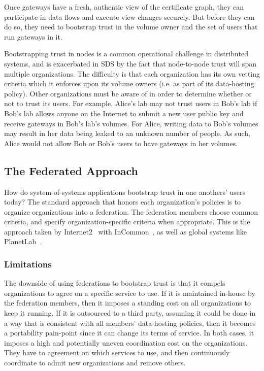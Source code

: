 Once gateways have a fresh, authentic view of the certificate graph, they can
participate in data flows and execute view changes securely.  But before they
can do so, they need to bootstrap trust in the volume owner and the set of users
that run gateways in it.

Bootstrapping trust in nodes is a common operational challenge in
distributed systems, and is exacerbated in SDS by the fact that node-to-node
trust will span multiple organizations.
The difficulty is that each organization has its own vetting criteria which it
enforces upon its volume owners (i.e. as part of its data-hosting policy).
Other organizations must be aware of in order to determine
whether or not to trust its users.  For example, Alice's lab may
not trust users in Bob's lab if Bob's lab allows anyone on the Internet
to submit a new user public key and receive gateways in Bob's
lab's volumes.  For Alice, writing data to Bob's volumes may result in her data
being leaked to an unknown number of people.  As such, Alice would not allow Bob
or Bob's users to have gateways in her volumes.

\subsection{The Federated Approach}

How do system-of-systems applications bootstrap trust in one anothers' users
today?  The standard approach that honors each organization's policies is to organize
organizations into a federation.  The federation members choose common criteria,
and specify organization-specific criteria when appropriate.  This is the
approach taken by Internet2~\cite{internet2} with InCommon~\cite{incommon}, as
well as global systems like PlanetLab~\cite{planet-lab}.

\subsubsection{Limitations}

The downside of using federations to bootstrap trust is that it compels
organizations to agree on a specific service to use.  If it is maintained in-house by the
federation members, then it imposes a standing cost on all organizations to keep it
running.  If it is outsourced to a third party, assuming it could be done in a way
that is consistent with all members' data-hosting policies, then it becomes a portability
pain-point since it can change its terms of service.  In both cases, it imposes
a high and potentially uneven coordination cost on the organizations.
They have to agreement on which services to use, and then continuously
coordinate to admit new organizations and remove others.

